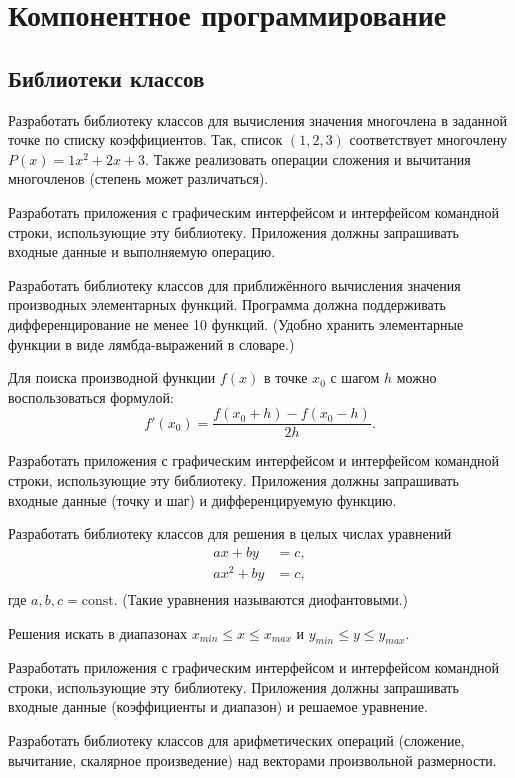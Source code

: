 \section{Компонентное программирование}

\subsection{Библиотеки классов}

\task Разработать библиотеку классов для вычисления значения
многочлена в заданной точке по списку коэффициентов. Так, список
$(1, 2, 3)$ соответствует многочлену $P(x)=1x^2+2x+3.$ Также
реализовать операции сложения и вычитания многочленов (степень может
различаться).

Разработать приложения с графическим интерфейсом и интерфейсом
командной строки, использующие эту библиотеку. Приложения должны
запрашивать входные данные и выполняемую операцию.

\task Разработать библиотеку классов для приближённого вычисления
значения производных элементарных функций. Программа должна
поддерживать дифференцирование не менее 10 функций. (Удобно хранить
элементарные функции в виде лямбда-выражений в словаре.)

Для поиска производной функции $f(x)$ в точке $x_0$ с шагом $h$ можно
воспользоваться формулой:
\[
f'(x_0) = \frac{f(x_0+h) - f(x_0-h)}{2h}.
\]

Разработать приложения с графическим интерфейсом и интерфейсом
командной строки, использующие эту библиотеку. Приложения должны
запрашивать входные данные (точку и шаг) и дифференцируемую функцию.

\task Разработать библиотеку классов для решения в целых числах
уравнений
\begin{align*}
a x + b y &= c,\\
a x^2 + b y &= c,\\
\end{align*}
где $a, b, c = \mathrm{const}.$ (Такие уравнения называются
диофантовыми.)

Решения искать в диапазонах $x_{min}\leqslant x \leqslant x_{max}$ и
$y_{min}\leqslant y \leqslant y_{max}.$

Разработать приложения с графическим интерфейсом и интерфейсом
командной строки, использующие эту библиотеку. Приложения должны
запрашивать входные данные (коэффициенты и диапазон) и решаемое
уравнение.

\task Разработать библиотеку классов для арифметических операций
(сложение, вычитание, скалярное произведение) над векторами
произвольной размерности.

